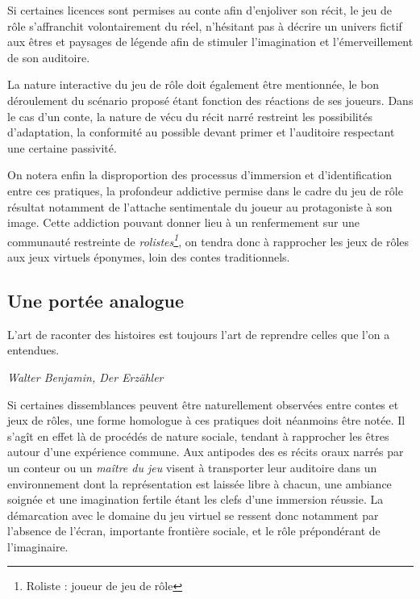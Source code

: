 Si certaines licences sont permises au conte afin d'enjoliver son récit, le jeu de rôle s'affranchit volontairement du réel, n'hésitant pas à décrire un univers fictif aux êtres et paysages de légende afin de stimuler l'imagination et l'émerveillement de son auditoire.

La nature interactive du jeu de rôle doit également être mentionnée, le bon déroulement du scénario proposé étant fonction des réactions de ses joueurs. Dans le cas d'un conte, la nature de vécu du récit narré restreint les possibilités d'adaptation, la conformité au possible devant primer et l'auditoire respectant une certaine passivité.

On notera enfin la disproportion des processus d'immersion et d'identification entre ces pratiques, la profondeur addictive permise dans le cadre du jeu de rôle résultat notamment de l'attache sentimentale du joueur au protagoniste à son image. Cette addiction pouvant donner lieu à un renfermement sur une communauté restreinte de \textit{rolistes\footnote{Roliste : joueur de jeu de rôle}}, on tendra donc à rapprocher les jeux de rôles aux jeux virtuels éponymes, loin des contes traditionnels.



\subsection{Une portée analogue}

\begin{shadequote}
L'art de raconter des histoires est toujours l'art de reprendre celles que l'on a entendues. \par\emph{Walter Benjamin, Der Erzähler}
\end{shadequote}


Si certaines dissemblances peuvent être naturellement observées entre contes et jeux de rôles, une forme homologue à ces pratiques doit néanmoins être notée. Il s'agît en effet là de procédés de nature sociale, tendant à rapprocher les êtres autour d'une expérience commune. Aux antipodes des es récits oraux narrés par un conteur ou un \textit{maître du jeu} visent à transporter leur auditoire dans un environnement dont la représentation est laissée libre à chacun, une ambiance soignée et une imagination fertile étant les clefs d'une immersion réussie. La démarcation avec le domaine du jeu virtuel se ressent donc notamment par l'absence de l'écran, importante frontière sociale, et le rôle prépondérant de l'imaginaire.

